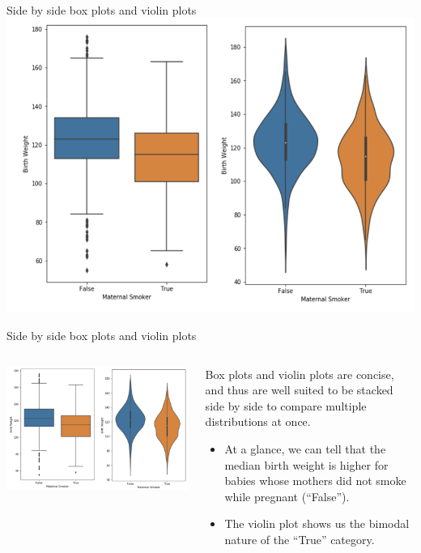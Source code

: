 \documentclass[aspectratio=169]{../latex_main/tntbeamer}  %
\begin{document}
	
	\begin{frame}{Side by side box plots and violin plots}
	    \centering
	    \includegraphics[scale=.4]{Bild43}
	\end{frame}
	
	
	\begin{frame}{Side by side box plots and violin plots}
	    \begin{columns}
            \begin{column}{.5\textwidth}

                       \includegraphics[scale=.4]{Bild44}

            \end{column}
            
            \begin{column}{.5\textwidth}
               Box plots and violin plots are concise, and thus are well suited to be stacked side by side to compare multiple distributions at once.
               \begin{itemize}
                   \item At a glance, we can tell that the median birth weight is higher for babies whose mothers did not smoke while pregnant (“False”).
                   \item The violin plot shows us the bimodal nature of the “True” category.
               \end{itemize}
            \end{column}
        \end{columns}
	\end{frame}
\end{document}
